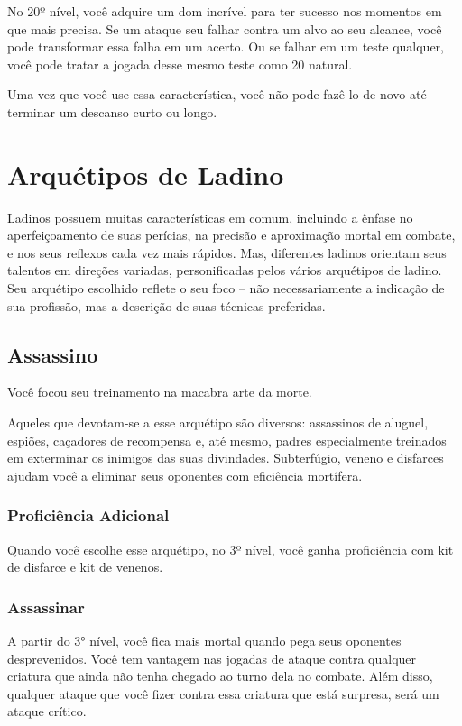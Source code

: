 \documentclass{RPG_Adventure}[2021/10/20]
\begin{document}
No 20º nível, você adquire um dom incrível para ter sucesso nos momentos em que
mais precisa. Se um ataque seu falhar contra um alvo ao seu alcance, você pode
transformar essa falha em um acerto. Ou se falhar em um teste qualquer, você
pode tratar a jogada desse mesmo teste como 20 natural.

Uma vez que você use essa característica, você não pode fazê-lo de novo até
terminar um descanso curto ou longo.

\section*{Arquétipos de Ladino}%

Ladinos possuem muitas características em comum, incluindo a ênfase no
aperfeiçoamento de suas perícias, na precisão e aproximação mortal em combate, e
nos seus reflexos cada vez mais rápidos. Mas, diferentes ladinos orientam seus
talentos em direções variadas, personificadas pelos vários arquétipos de ladino.
Seu arquétipo escolhido reflete o seu foco – não necessariamente a indicação de
sua profissão, mas a descrição de suas técnicas preferidas.

\subsection*{Assassino}%
\label{sub:assassino}

Você focou seu treinamento na macabra arte da morte.

Aqueles que devotam-se a esse arquétipo são diversos: assassinos de aluguel,
espiões, caçadores de recompensa e, até mesmo, padres especialmente treinados em
exterminar os inimigos das suas divindades. Subterfúgio, veneno e disfarces
ajudam você a eliminar seus oponentes com eficiência mortífera.

\subsubsection{Proficiência Adicional}%

Quando você escolhe esse arquétipo, no 3º nível, você ganha proficiência com kit
de disfarce e kit de venenos.

\subsubsection{Assassinar}%

A partir do 3° nível, você fica mais mortal quando pega seus oponentes
desprevenidos. Você tem vantagem nas jogadas de ataque contra qualquer criatura
que ainda não tenha chegado ao turno dela no combate. Além disso, qualquer
ataque que você fizer contra essa criatura que está surpresa, será um ataque
crítico.
\end{document}
